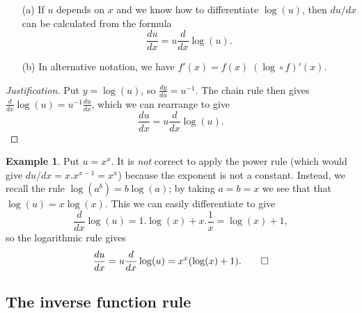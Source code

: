 \documentclass[a4paper]{book}
\newcommand{\RED}[1]{{\color{red}#1}}
\renewcommand{\:}{\colon}
\newcommand{\EMPH}[1]{\RED{\emph{#1}}}
\theoremstyle{definition}
\newtheorem{example}[theorem]{Example}
\begin{document}
\begin{itemize}
 \item[(a)] If $u$ depends on $x$ and we know how to differentiate
  $\log(u)$, then $du/dx$ can be calculated from the formula
   \[ \frac{du}{dx} = u \frac{d}{dx}\log(u). \]
 \item[(b)] In alternative notation, we have
  $f'(x)=f(x)\;(\log\circ f)'(x)$. 
\end{itemize}
\begin{proof}[Justification]
 Put $y=\log(u)$, so $\frac{dy}{du}=u^{-1}$.  The chain rule then
 gives $\frac{d}{dx}\log(u)=u^{-1}\frac{du}{dx}$, which we can
 rearrange to give
 \[ \frac{du}{dx} = u \frac{d}{dx}\log(u). \]
\end{proof}
\begin{example}
 Put $u=x^x$.  It is \EMPH{not} correct to apply the power rule (which
 would give $du/dx=x.x^{x-1}=x^x$) because the exponent is not a
 constant.  Instead, we recall the rule $\log(a^b)=b\log(a)$; by
 taking $a=b=x$ we see that that $\log(u)=x\log(x)$.  This we can
 easily differentiate to give 
 \[ \frac{d}{dx}\log(u) = 1.\log(x)+x.\frac{1}{x} = \log(x)+1, \]
 so the logarithmic rule gives
 \[ \frac{du}{dx} = u\frac{d}{dx}\log(u) = x^x(\log(x)+1). \qed \]
\end{example}

\subsection{The inverse function rule}
\label{subsec-rule-inv}
\end{document}
